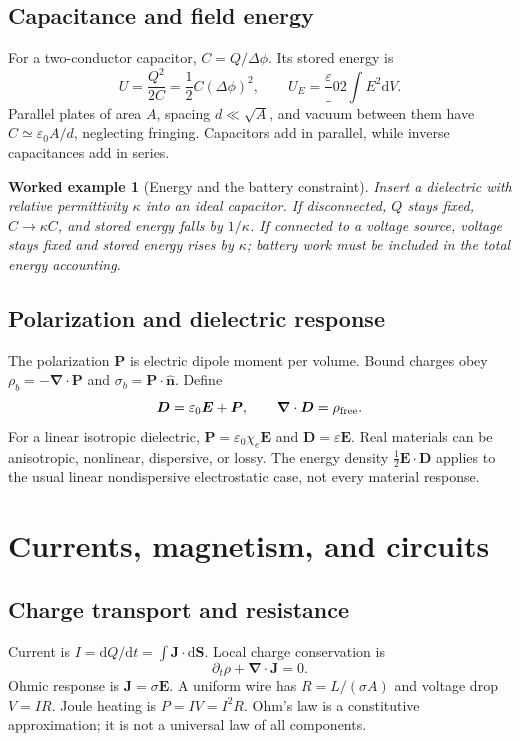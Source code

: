 \documentclass[11pt,oneside]{book}
\newcommand{\dd}{\mathrm{d}}
\newcommand{\vect}[1]{\boldsymbol{#1}}
\newcommand{\grad}{\boldsymbol{\nabla}}
\newcommand{\eps}{\varepsilon_0}
\theoremstyle{reviewstyle}
\newtheorem{example}{Worked example}[chapter]
\begin{document}
\section{Capacitance and field energy}
For a two-conductor capacitor, $C=Q/\Delta\phi$. Its stored energy is
\begin{equation}U=\frac{Q^2}{2C}=\frac12C(\Delta\phi)^2,\qquad U_E=\frac\eps2\int E^2\dd V.\end{equation}
Parallel plates of area $A$, spacing $d\ll\sqrt A$, and vacuum between them have $C\simeq\eps A/d$, neglecting fringing. Capacitors add in parallel, while inverse capacitances add in series.
\begin{example}[Energy and the battery constraint]
Insert a dielectric with relative permittivity $\kappa$ into an ideal capacitor. If disconnected, $Q$ stays fixed, $C\to\kappa C$, and stored energy falls by $1/\kappa$. If connected to a voltage source, voltage stays fixed and stored energy rises by $\kappa$; battery work must be included in the total energy accounting.
\end{example}
\section{Polarization and dielectric response}
The polarization $\vect P$ is electric dipole moment per volume. Bound charges obey $\rho_b=-\grad\cdot\vect P$ and $\sigma_b=\vect P\cdot\hat{\vect n}$. Define
\begin{equation}\vect D=\eps\vect E+\vect P,\qquad \grad\cdot\vect D=\rho_{\rm free}.\end{equation}
For a linear isotropic dielectric, $\vect P=\eps\chi_e\vect E$ and $\vect D=\varepsilon\vect E$. Real materials can be anisotropic, nonlinear, dispersive, or lossy. The energy density $\tfrac12\vect E\cdot\vect D$ applies to the usual linear nondispersive electrostatic case, not every material response.

\chapter{Currents, magnetism, and circuits}
\section{Charge transport and resistance}
Current is $I=\dd Q/\dd t=\int\vect J\cdot\dd\vect S$. Local charge conservation is
\begin{equation}\partial_t\rho+\grad\cdot\vect J=0.\end{equation}
Ohmic response is $\vect J=\sigma\vect E$. A uniform wire has $R=L/(\sigma A)$ and voltage drop $V=IR$. Joule heating is $P=IV=I^2R$. Ohm's law is a constitutive approximation; it is not a universal law of all components.
\end{document}
